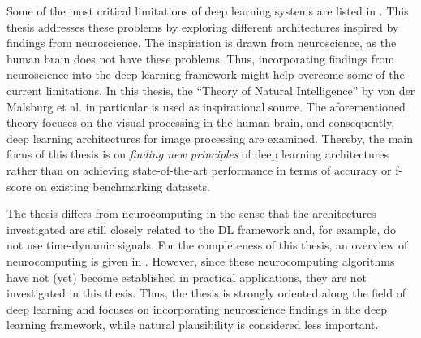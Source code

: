 Some of the most critical limitations of deep learning systems are listed in .
This thesis addresses these problems by exploring different architectures inspired by findings from neuroscience.
The inspiration is drawn from neuroscience, as the human brain does not have these problems. Thus, incorporating findings from neuroscience into the deep learning framework might help overcome some of the current limitations.
In this thesis, the ``Theory of Natural Intelligence'' by von der Malsburg et al.  in particular is used as inspirational source.
The aforementioned theory focuses on the visual processing in the human brain, and consequently, deep learning architectures for image processing are examined.
Thereby, the main focus of this thesis is on \emph{finding new principles} of deep learning architectures rather than on achieving state-of-the-art performance in terms of accuracy or f-score on existing benchmarking datasets.

The thesis differs from neurocomputing in the sense that the architectures investigated are still closely related to the DL framework and, for example, do not use time-dynamic signals. 
For the completeness of this thesis, an overview of neurocomputing is given in .
However, since these neurocomputing algorithms have not (yet) become established in practical applications, they are not investigated in this thesis.
Thus, the thesis is strongly oriented along the field of deep learning and focuses on incorporating neuroscience findings in the deep learning framework, while natural plausibility is considered less important.


